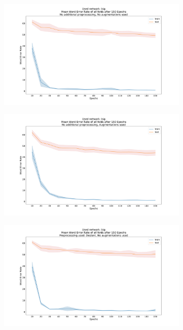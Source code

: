 \documentclass{article}
\begin{document}
\begin{minipage}[H]{1\linewidth}
\begin{figure}[H]
	\begin{adjustwidth}{-8em}{-8em}
	\centering
    \begin{subfigure}{0.7\textwidth}
        \centering
        \includegraphics[width=\textwidth]{Standard_big_150_wer}
    \end{subfigure}
    \begin{subfigure}{0.7\textwidth}
        \centering
        \includegraphics[width=\textwidth]{Standard_big_150_augmentations_wer}
    \end{subfigure}
    \begin{subfigure}{0.7\textwidth}
        \centering
        \includegraphics[width=\textwidth]{Deslant_big_150_wer}

\end{subfigure}
\end{adjustwidth}
\end{figure}
\end{minipage}
\end{document}
